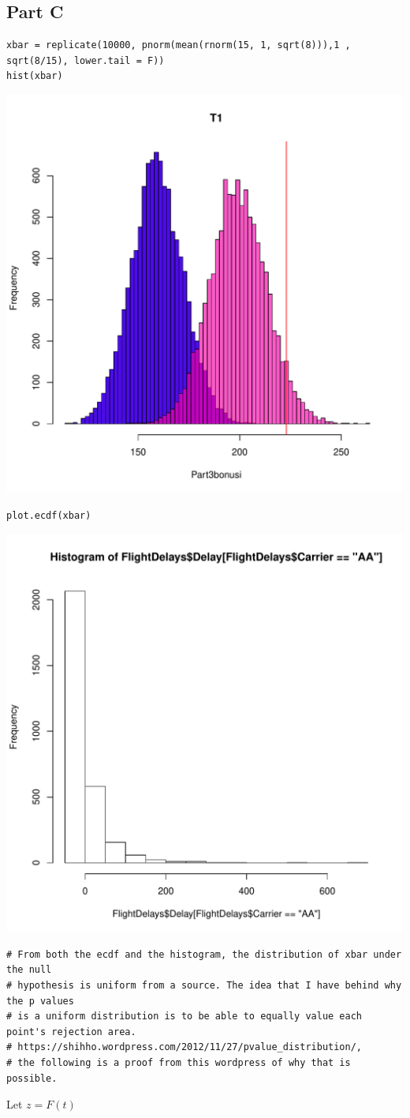 \documentclass{article}\usepackage[]{graphicx}\usepackage[]{color}
\makeatletter
\newenvironment{kframe}{%
 \def\at@end@of@kframe{}%
 \ifinner\ifhmode%
  \def\at@end@of@kframe{\end{minipage}}%
  \begin{minipage}{\columnwidth}%
 \fi\fi%
 \def\FrameCommand##1{\hskip\@totalleftmargin \hskip-\fboxsep
 \colorbox{shadecolor}{##1}\hskip-\fboxsep
     \hskip-\linewidth \hskip-\@totalleftmargin \hskip\columnwidth}%
 \MakeFramed {\advance\hsize-\width
   \@totalleftmargin\z@ \linewidth\hsize
   \@setminipage}}%
 {\par\unskip\endMakeFramed%
 \at@end@of@kframe}
\newenvironment{knitrout}{}{} %
\makeatother
\begin{document}
\subsection*{Part C}
\begin{knitrout}
\color{fgcolor}\begin{kframe}
\begin{verbatim}
xbar = replicate(10000, pnorm(mean(rnorm(15, 1, sqrt(8))),1 , sqrt(8/15), lower.tail = F))
hist(xbar)
\end{verbatim}
\end{kframe}
\includegraphics[width=0.33\linewidth]{figure/unnamed-chunk-10-1} 
\begin{kframe}\begin{verbatim}
plot.ecdf(xbar)
\end{verbatim}
\end{kframe}
\includegraphics[width=0.33\linewidth]{figure/unnamed-chunk-10-2} 
\begin{kframe}\begin{verbatim}
# From both the ecdf and the histogram, the distribution of xbar under the null  
# hypothesis is uniform from a source. The idea that I have behind why the p values 
# is a uniform distribution is to be able to equally value each point's rejection area.  
# https://shihho.wordpress.com/2012/11/27/pvalue_distribution/, 
# the following is a proof from this wordpress of why that is possible.
\end{verbatim}
\end{kframe}
\end{knitrout}
Let $z=F(t)$
\end{document}
